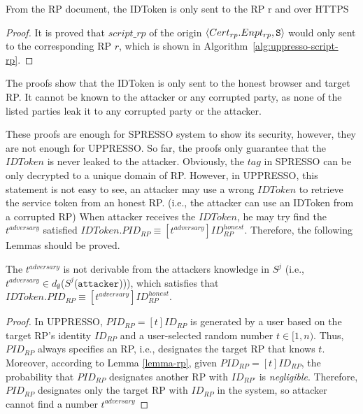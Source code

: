   \begin{lemma}\label{lemma:script-rp-to-rp} %
    From the RP document, the IDToken is only sent to the RP r 
    and over HTTPS
  \end{lemma}
  \begin{proof}
    It is proved that $script\_rp$ of the origin 
    $\langle Cert_{rp}.Enpt_{rp}, \mathtt{S}\rangle$ 
    would only sent to the corresponding RP $r$, 
    which is shown in Algorithm~\ref{alg:uppresso-script-rp}.
  \end{proof}
  
  The proofs show that the IDToken is only sent to the honest 
  browser and target RP. It cannot be known to the attacker or 
  any corrupted party, as none of the listed parties leak it to 
  any corrupted party or the attacker.
  
  These proofs are enough for SPRESSO system to show its 
  security, however, they are not enough for UPPRESSO. So far, 
  the proofs only guarantee that the $IDToken$ is never leaked 
  to the attacker. Obviously, the $tag$ in SPRESSO can be only 
  decrypted to a unique domain of RP. However, in UPPRESSO, this 
  statement is not easy to see, an attacker may use a wrong 
  $IDToken$ to retrieve the service token from an honest RP.
  (i.e., the attacker can use an IDToken from a corrupted RP)
  When attacker receives the $IDToken$, he may try find the $t^{adversary}$ 
  satisfied $IDToken.PID_{RP} \equiv [t^{adversary}]ID_{RP}^{honest}$.
  Therefore, the following Lemmas should be proved.

  \begin{lemma}
    The $t^{adversary}$ is not derivable from the attackers knowledge in $S^j$ (i.e., $t^{adversary} \in d_{\emptyset}$($S^j$($\mathtt{attacker}$))), which satisfies that $IDToken.PID_{RP} \equiv [t^{adversary}]ID_{RP}^{honest}$.
  \end{lemma}
  \begin{proof}
    In UPPRESSO, $PID_{RP}=[t]ID_{RP}$ is generated by a user based on the target RP's identity $ID_{RP}$ and a user-selected random number $t \in [1,n)$.
    Thus, $PID_{RP}$ always specifies an RP, i.e., %
    designates the target RP that knows $t$. 
    Moreover, according to Lemma \ref{lemma-rp}, given $PID_{RP} = [t]ID_{RP}$, the probability that $PID_{RP}$ designates another RP with $ID_{RP'}$ is \emph{negligible}. %
    Therefore, $PID_{RP}$ designates only the target RP with $ID_{RP}$ in the system, 
    so attacker cannot find a number $t^{adversary}$\hfill
  \end{proof}
  
